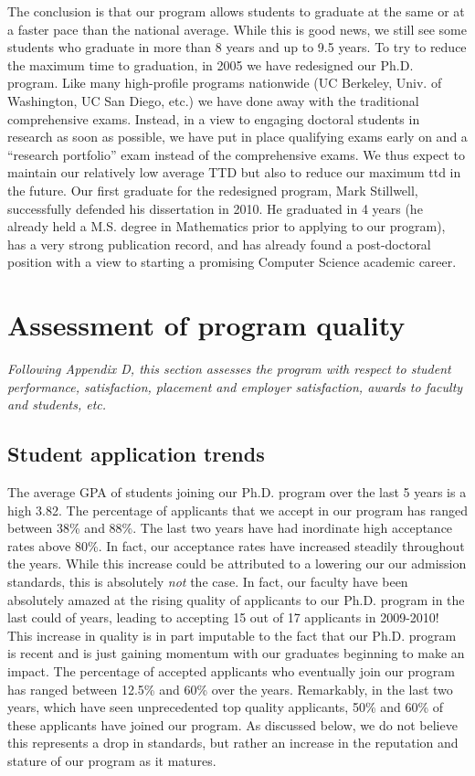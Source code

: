 \documentclass[12pt]{article}
\begin{document}
The conclusion is that our program allows students to graduate at the
same or at a faster pace than the national average.  While this is good
news, we still see some students who graduate in more than 8 years and up
to 9.5 years. To try to reduce the maximum time to graduation, in 2005
we have redesigned our Ph.D. program.  Like many high-profile programs
nationwide (UC Berkeley, Univ.  of Washington, UC San Diego, etc.) we
have done away with the traditional comprehensive exams.  Instead, in
a view to engaging doctoral students in research as soon as possible,
we have put in place qualifying exams early on and a ``research
portfolio'' exam instead of the comprehensive exams. We thus expect to
maintain our relatively low average TTD but also to reduce our maximum
ttd in the future. Our first graduate for the redesigned program, Mark
Stillwell, successfully defended his dissertation in 2010. He
graduated in 4 years (he already held a M.S. degree in
Mathematics prior to applying to our program), has a very strong
publication record, and has already found a post-doctoral position with
a view to starting a promising Computer Science academic career.


\section{Assessment of program quality}

{\em Following Appendix D, this section assesses the program with respect
  to student performance, satisfaction, placement and employer
  satisfaction, awards to faculty and students, etc.}

\subsection*{Student application trends}

The average GPA of students joining our Ph.D. program over the last 5 years
is a high 3.82. The percentage of applicants that we accept in our program
has ranged between 38\% and 88\%. The last two years have had inordinate
high acceptance rates above 80\%. In fact, our acceptance rates have
increased steadily throughout the years. While this increase could be
attributed to a lowering our our admission standards, this is absolutely
\emph{not} the case. In fact, our faculty have been absolutely amazed at
the rising quality of applicants to our Ph.D. program in the last could of
years, leading to accepting 15 out of 17 applicants in 2009-2010! This
increase in quality is in part imputable to the fact that our Ph.D. program
is recent and is just gaining momentum with our graduates beginning to make
an impact.  The percentage of accepted applicants who eventually join our
program has ranged between 12.5\% and 60\% over the years. Remarkably, in
the last two years, which have seen unprecedented top quality applicants,
50\% and 60\% of these applicants have joined our program. As discussed
below, we do not believe this represents a drop in standards, but rather an increase
in the reputation and stature of our program as it matures.
\end{document}
